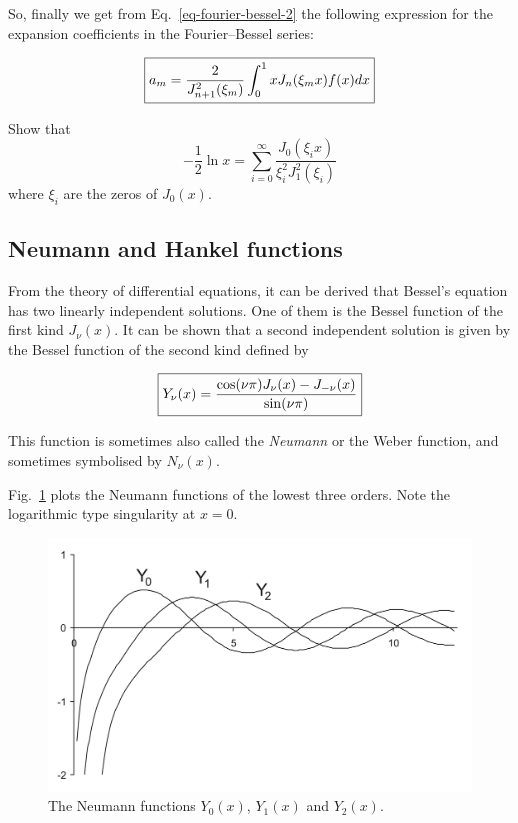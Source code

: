 So, finally we get from Eq.~\ref{eq-fourier-bessel-2} the following expression for the expansion coefficients in the Fourier--Bessel series:

\begin{equation}
\fbox{$\displaystyle
a_m = \frac{2}{J_{n+1}^2(\xi_m)}\int_0^1 x J_n(\xi_m x) f(x) dx
$}
\end{equation} 

\begin{sidebar}
\begin{ex}
Show that
$$-\frac{1}{2} \ln x = \sum_{i=0}^{\infty} \frac{J_0(\xi_i x)}{\xi_i^2 J_1^2(\xi_i)}$$
where $\xi_i$ are the zeros of $J_0(x)$.
\end{ex}
\end{sidebar}

\subsection{Neumann and Hankel functions}

From the theory of differential equations, it can be derived that Bessel's equation has two linearly independent solutions. One of them is the Bessel function of the first kind $J_\nu(x)$. It can be shown that a second independent solution is given by the Bessel function of the second kind defined by

\begin{equation}
\fbox{$\displaystyle
Y_\nu(x) = \frac{\cos(\nu \pi)J_\nu(x) - J_{-\nu}(x)}{\sin(\nu \pi)}
$}
\end{equation} 

This function is sometimes also called the \emph{Neumann} or the Weber function, and sometimes symbolised by $N_\nu(x)$.

Fig.~\ref{fig-bessel-Y} plots the Neumann functions of the lowest three orders. Note the logarithmic type singularity at $x=0$.

\begin{figure}
\centering
\includegraphics[scale=0.7]{special/figures/y}
\caption{The Neumann functions $Y_0(x)$, $Y_1(x)$ and $Y_2(x)$.}
\label{fig-bessel-Y}
\end{figure}

